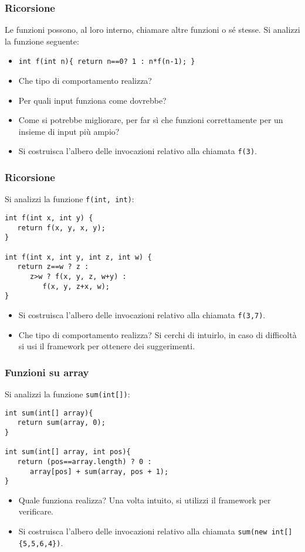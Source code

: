 \documentclass{beamer}
\begin{document}
\begin{frame}
\frametitle{Ricorsione}
Le funzioni possono, al loro interno, chiamare altre funzioni o sé stesse. Si analizzi la funzione seguente: 
\begin{itemize}
 \item \texttt{int f(int n)\{ return n==0? 1 : n*f(n-1); \}}
\end{itemize}
\begin{itemize}
 \item Che tipo di comportamento realizza?
 \item Per quali input funziona come dovrebbe?
 \item Come si potrebbe migliorare, per far sì che funzioni correttamente per un insieme di input più ampio?
 \item Si costruisca l'albero delle invocazioni relativo alla chiamata \texttt{f(3)}.
\end{itemize}
\end{frame}

\begin{frame}[fragile]
\frametitle{Ricorsione}
Si analizzi la funzione \texttt{f(int, int)}:
\begin{verbatim}
int f(int x, int y) {
   return f(x, y, x, y);
}

int f(int x, int y, int z, int w) {
   return z==w ? z :
      z>w ? f(x, y, z, w+y) :
         f(x, y, z+x, w);
}
\end{verbatim}
\begin{itemize}
 \item Si costruisca l'albero delle invocazioni relativo alla chiamata \texttt{f(3,7)}.
 \item Che tipo di comportamento realizza? Si cerchi di intuirlo, in caso di difficoltà si usi il framework per ottenere dei suggerimenti.
\end{itemize}
\end{frame}

\begin{frame}[fragile]
\frametitle{Funzioni su array}
Si analizzi la funzione \texttt{sum(int[])}:
\begin{verbatim}
int sum(int[] array){
   return sum(array, 0);
}

int sum(int[] array, int pos){
   return (pos==array.length) ? 0 :
      array[pos] + sum(array, pos + 1);
}
\end{verbatim}
\begin{itemize}
 \item Quale funziona realizza? Una volta intuito, si utilizzi il framework per verificare.
 \item Si costruisca l'albero delle invocazioni relativo alla chiamata \texttt{sum(new int[]\{5,5,6,4\})}. 
\end{itemize}
\end{frame}
\end{document}
